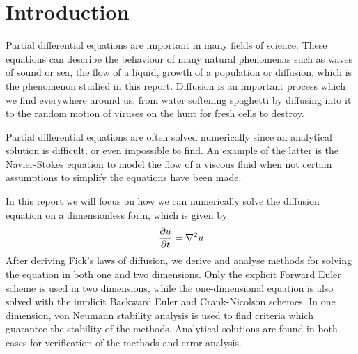 \section{Introduction}
Partial differential equations are important in many fields of science. These equations can describe the behaviour of many natural phenomenas such as waves of sound or sea, the flow of a liquid, growth of a population or diffusion, which is the phenomenon studied in this report. Diffusion is an important process which we find everywhere around us, from water softening spaghetti by diffusing into it to the random motion of viruses on the hunt for fresh cells to destroy.

Partial differential equations are often solved numerically since an analytical solution is difficult, or even impossible to find. An example of the latter is the Navier-Stokes equation to model the flow of a viscous fluid when not certain assumptions to simplify the equations have been made.

In this report we will focus on how we can numerically solve the diffusion equation on a dimensionless form, which is given by
\begin{equation}\label{eq:diffusion}
\begin{aligned}
\pdv{u}{t} = \nabla^2 u
\end{aligned}
\end{equation}
After deriving Fick's laws of diffusion, we derive and analyse methods for solving the equation in both one and two dimensions. Only the explicit Forward Euler scheme is used in two dimensions, while the one-dimensional equation is also solved with the implicit Backward Euler and Crank-Nicolson schemes. In one dimension, von Neumann stability analysis is used to find criteria which guarantee the stability of the methods. Analytical solutions are found in both cases for verification of the methods and error analysis.
